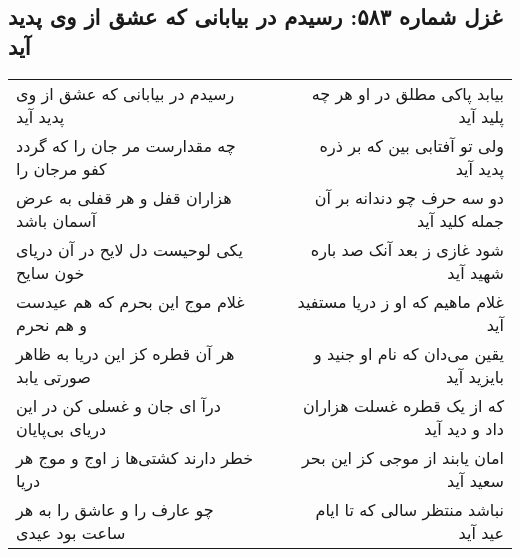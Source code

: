 \begin{center}
\section*{غزل شماره ۵۸۳: رسیدم در بیابانی که عشق از وی پدید آید}
\label{sec:0583}
\begin{longtable}{l p{0.5cm} r}
رسیدم در بیابانی که عشق از وی پدید آید
&&
بیابد پاکی مطلق در او هر چه پلید آید
\\
چه مقدارست مر جان را که گردد کفو مرجان را
&&
ولی تو آفتابی بین که بر ذره پدید آید
\\
هزاران قفل و هر قفلی به عرض آسمان باشد
&&
دو سه حرف چو دندانه بر آن جمله کلید آید
\\
یکی لوحیست دل لایح در آن دریای خون سایح
&&
شود غازی ز بعد آنک صد باره شهید آید
\\
غلام موج این بحرم که هم عیدست و هم نحرم
&&
غلام ماهیم که او ز دریا مستفید آید
\\
هر آن قطره کز این دریا به ظاهر صورتی یابد
&&
یقین می‌دان که نام او جنید و بایزید آید
\\
درآ ای جان و غسلی کن در این دریای بی‌پایان
&&
که از یک قطره غسلت هزاران داد و دید آید
\\
خطر دارند کشتی‌ها ز اوج و موج هر دریا
&&
امان یابند از موجی کز این بحر سعید آید
\\
چو عارف را و عاشق را به هر ساعت بود عیدی
&&
نباشد منتظر سالی که تا ایام عید آید
\\
\end{longtable}
\end{center}
